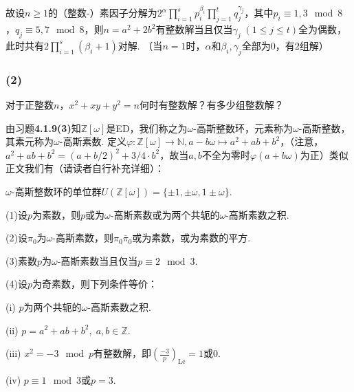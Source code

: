 故设$n\geq 1$的（整数-）素因子分解为$2^{\alpha}\prod_{i=1}^sp_i^{\beta_i}\prod_{j=1}^tq_j^{\gamma_j}$，其中$p_i\equiv 1,3\mod 8$，$q_j\equiv 5,7\mod 8$，则$n=a^2+2b^2$有整数解当且仅当$\gamma_j\;(1\leq j\leq t)$全为偶数，此时共有$2\prod_{i=1}^s(\beta_i+1)$对解. （当$n=1$时，$\alpha$和$\beta_i, \gamma_j$全部为$0$，有$2$组解）


\subsubsection{(2)}
对于正整数$n$，$x^2+xy+y^2=n$何时有整数解？有多少组整数解？


\jie 由{\heiti 习题}\textbf{4.1.9(3)}知$\mathbb{Z}[\omega]$是ED，我们称之为$\omega$-高斯整数环，元素称为$\omega$-高斯整数，其素元称为$\omega$-高斯素数. 定义$\varphi: \mathbb{Z}[\omega]\rightarrow\mathbb{N}, a-b\omega\mapsto a^2+ab+b^2$，（注意，$a^2+ab+b^2=(a+b/2)^2+3/4\cdot b^2$，故当$a,b$不全为零时$\varphi(a+b\omega)$为正）类似正文我们有（请读者自行补充详细）：

$\omega$-高斯整数环的单位群$U(\mathbb{Z}[\omega])=\{\pm 1, \pm\omega, 1\pm\omega\}$.

(1)设$p$为素数，则$p$或为$\omega$-高斯素数或为两个共轭的$\omega$-高斯素数之积.

(2)设$\pi_0$为$\omega$-高斯素数，则$\pi_0\overline{\pi}_0$或为素数，或为素数的平方.

(3)素数$p$为$\omega$-高斯素数当且仅当$p\equiv 2\mod 3$.

(4)设$p$为奇素数，则下列条件等价：

(i) $p$为两个共轭的$\omega$-高斯素数之积.

(ii) $p=a^2+ab+b^2,\;a,b\in\mathbb{Z}.$

(iii) $x^2=-3\mod p$有整数解，即$\left(\frac{-3}{p}\right)_{\mathrm{Le}}=1$或$0$.

(iv) $p\equiv 1\mod 3$或$p=3$.

